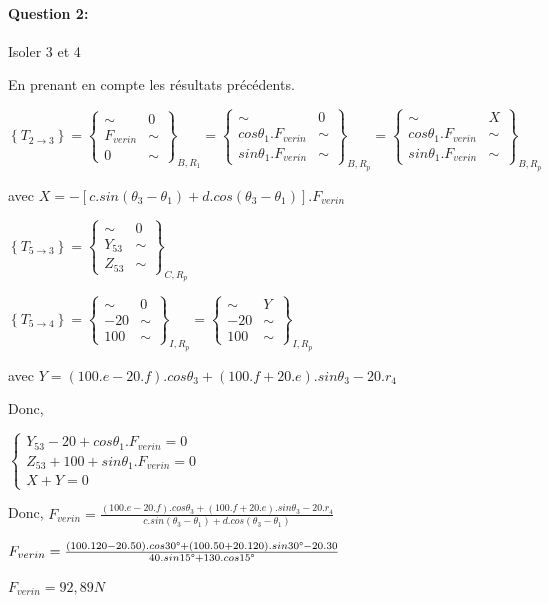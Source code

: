 \paragraph{Question 2:}

Isoler 3 et 4

En prenant en compte les résultats précédents.

$\left\{T_{2\rightarrow 3}\right\}=\left\{
\begin{array}{cc}
\sim & 0 \\
F_{verin} & \sim \\
0 & \sim
\end{array}
\right\}_{B,R_1}=\left\{
\begin{array}{cc}
\sim & 0 \\
cos\theta_1.F_{verin}  & \sim \\
sin\theta_1.F_{verin}  & \sim
\end{array}
\right\}_{B,R_p}=\left\{
\begin{array}{cc}
\sim & X \\
cos\theta_1.F_{verin} & \sim \\
sin\theta_1.F_{verin} & \sim
\end{array}
\right\}_{B,R_p}$

avec $X=-\left[c.sin(\theta_3-\theta_1)+d.cos(\theta_3-\theta_1)\right].F_{verin}$

$\left\{T_{5\rightarrow 3}\right\}=\left\{
\begin{array}{cc}
\sim & 0 \\
Y_{53} & \sim \\
Z_{53} & \sim
\end{array}
\right\}_{C,R_p}$

$\left\{T_{5\rightarrow 4}\right\}=\left\{
\begin{array}{cc}
\sim & 0 \\
-20 & \sim \\
100 & \sim
\end{array}
\right\}_{I,R_p}=\left\{
\begin{array}{cc}
\sim & Y \\
-20 & \sim \\
100 & \sim
\end{array}
\right\}_{I,R_p}$

avec $Y=(100.e-20.f).cos\theta_3+(100.f+20.e).sin\theta_3-20.r_4$

Donc,

$\left\{\begin{array}{l}
Y_{53}-20+cos\theta_1.F_{verin}=0 \\
Z_{53}+100+sin\theta_1.F_{verin}=0 \\
X+Y=0
\end{array}\right.$

Donc, $F_{verin}=\frac{(100.e-20.f).cos\theta_3+(100.f+20.e).sin\theta_3-20.r_4}{c.sin(\theta_3-\theta_1)+d.cos(\theta_3-\theta_1)}$

$F_{verin}=\frac{(100.120-20.50).cos30\degree+(100.50+20.120).sin30\degree-20.30}{40.sin15\degree+130.cos15\degree}$

$F_{verin}=92,89N$



